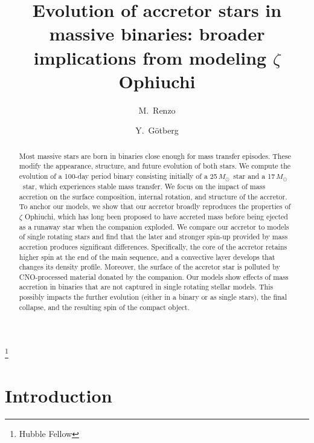 \documentclass[twocolumn,twocolappendix,trackchanges]{aastex63}
\newcommand{\Msun}{\ensuremath{\,M_\odot}}
\begin{document}
\graphicspath{{./figures/}}

\title{Evolution of accretor stars in massive binaries: broader
  implications from modeling $\zeta$ Ophiuchi}

\author[0000-0002-6718-9472]{M.~Renzo}

\author[0000-0002-6960-6911]{Y.~G\"otberg}\thanks{Hubble Fellow}


\begin{abstract}
  Most massive stars are born in binaries close enough for mass
  transfer episodes. These modify the appearance, structure, and
  future evolution of both stars. We compute the evolution of a
  100-day period binary consisting initially of a 25\Msun\ star and a
  17\Msun\ star, which experiences stable mass transfer. We focus on
  the impact of mass accretion on the surface composition, internal
  rotation, and structure of the accretor. To anchor our models, we
  show that our accretor broadly reproduces the
  properties of $\zeta$ Ophiuchi, which has long been proposed to have
  accreted mass before being ejected as a runaway star when the
  companion exploded. We compare our accretor to models of
  single rotating stars and find that the later and stronger spin-up
  provided by mass accretion produces significant
  differences. Specifically, the core of the accretor retains higher
  spin at the end of the main sequence, and a convective layer
  develops that changes its density profile. Moreover, the surface of
  the accretor star is polluted by CNO-processed material donated by
  the companion. Our models show effects of mass accretion in
  binaries that are not captured in single rotating stellar
  models. This possibly impacts the further evolution (either in a
  binary or as single stars), the final collapse, and the resulting
  spin of the compact object.
\end{abstract}


\section{Introduction}
\label{sec:intro}
\end{document}
